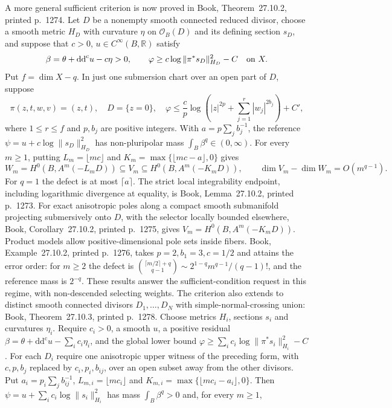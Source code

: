 \documentclass[11pt]{article}
\begin{document}
A more general sufficient criterion is now proved in Book, Theorem~27.10.2, printed p.~1274. Let $D$ be a nonempty smooth connected reduced divisor, choose a smooth metric $H_D$ with curvature $\eta$ on $\mathcal O_B(D)$ and its defining section $s_D$, and suppose that $c>0$, $u\in C^\infty(B,\mathbb R)$ satisfy
\[
 \beta=\theta+\mathrm{dd}^{\mathrm c}u-c\eta>0,
 \qquad \varphi\geq c\log\|\pi^*s_D\|_{H_D}^2-C
 \quad\hbox{on }X.
\]
Put $f=\dim X-q$. In just one submersion chart over an open part of $D$, suppose
\[
 \pi(z,t,w,v)=(z,t),\quad D=\{z=0\},\quad
 \varphi\leq\frac cp\log\left(|z|^{2p}+\sum_{j=1}^r|w_j|^{2b_j}\right)+C',
\]
where $1\leq r\leq f$ and $p,b_j$ are positive integers. With $a=p\sum_jb_j^{-1}$, the reference $\psi=u+c\log\|s_D\|_{H_D}^2$ has non-pluripolar mass $\int_B\beta^q\in(0,\infty)$. For every $m\geq1$, putting $L_m=\lfloor mc\rfloor$ and $K_m=\max\{\lfloor mc-a\rfloor,0\}$ gives
\[
 W_m=H^0(B,A^m(-L_mD))\subseteq V_m
                  \subseteq H^0(B,A^m(-K_mD)),
 \qquad \dim V_m-\dim W_m=O(m^{q-1}).
\]
For $q=1$ the defect is at most $\lceil a\rceil$. The strict local integrability endpoint, including logarithmic divergence at equality, is Book, Lemma~27.10.2, printed p.~1273. For exact anisotropic poles along a compact smooth submanifold projecting submersively onto $D$, with the selector locally bounded elsewhere, Book, Corollary~27.10.2, printed p.~1275, gives $V_m=H^0(B,A^m(-K_mD))$. Product models allow positive-dimensional pole sets inside fibers. Book, Example~27.10.2, printed p.~1276, takes $p=2,b_1=3,c=1/2$ and attains the error order: for $m\geq2$ the defect is $\binom{\lceil m/2\rceil+q}{q-1}\sim2^{1-q}m^{q-1}/(q-1)!$, and the reference mass is $2^{-q}$. These results answer the sufficient-condition request in this regime, with non-descended selecting weights.
The criterion also extends to distinct smooth connected divisors $D_1,\ldots,D_N$ with simple-normal-crossing union: Book, Theorem~27.10.3, printed p.~1278. Choose metrics $H_i$, sections $s_i$ and curvatures $\eta_i$. Require $c_i>0$, a smooth $u$, a positive residual $\beta=\theta+\mathrm{dd}^{\mathrm c}u-\sum_i c_i\eta_i$, and the global lower bound $\varphi\geq\sum_i c_i\log\|\pi^*s_i\|_{H_i}^2-C$. For each $D_i$ require one anisotropic upper witness of the preceding form, with $c,p,b_j$ replaced by $c_i,p_i,b_{ij}$, over an open subset away from the other divisors. Put $a_i=p_i\sum_j b_{ij}^{-1}$, $L_{m,i}=\lfloor mc_i\rfloor$ and $K_{m,i}=\max\{\lfloor mc_i-a_i\rfloor,0\}$. Then $\psi=u+\sum_i c_i\log\|s_i\|_{H_i}^2$ has mass $\int_B\beta^q>0$ and, for every $m\geq1$,
\end{document}

